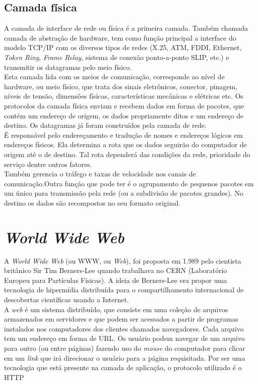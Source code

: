 \subsection{Camada física}
A camada de interface de rede ou física é a primeira camada. Também chamada 
camada de abstração de hardware, tem como função principal a interface do 
modelo TCP/IP com os diversos tipos de redes (X.25, ATM, FDDI, Ethernet, 
\textit{Token Ring}, \textit{Frame Relay}, sistema de conexão ponto-a-ponto 
SLIP, etc.) e transmitir os datagramas pelo meio físico.\\
Esta camada lida com os meios de comunicação, corresponde ao nível de hardware, 
ou meio físico, que trata dos sinais eletrônicos, conector, pinagem, níveis de 
tensão, dimensões físicas, características mecânicas e elétricas etc. Os 
protocolos da camada física enviam e recebem dados em forma de pacotes, que 
contém um endereço de origem, os dados propriamente ditos e um endereço de 
destino. Os datagramas já foram construídos pela camada de rede.\\
É responsável pelo endereçamento e tradução de nomes e endereços lógicos em 
endereços físicos. Ela determina a rota que os dados seguirão do computador de 
origem até o de destino. Tal rota dependerá das condições da rede, prioridade 
do serviço dentre outros fatores.\\
Também gerencia o tráfego e taxas de velocidade nos canais de comunicação.Outra 
função que pode ter é o agrupamento de pequenos pacotes em um único para  
transmissão pela rede (ou a subdivisão de pacotes grandes). No destino os dados 
são recompostos no seu formato original.\\
\section{\textit{World Wide Web}}
A \textit{World Wide Web} (ou WWW, ou \textit{Web}), foi proposta em 1.989 pelo 
cientista britânico Sir Tim Berners-Lee quando trabalhava no CERN (Laboratório 
Europeu para Partículas Físicas). A ideia de Berners-Lee era propor uma 
tecnologia de hipermídia distribuída para o compartilhamento internacional de 
descobertas científicas usando a Internet.\\
A \textit{web} é um sistema distribuído, que consiste em uma coleção de 
arquivos armazenados em servidores e que podem ser acessados a partir de 
programas instalados nos computadores dos clientes chamados navegadores. Cada 
arquivo tem um endereço em forma de URL. Os usuário podem navegar de um arquivo 
para outro (ou entre páginas) fazendo uso do \textit{mouse} do computador para 
clicar em um \textit{link} que irá direcionar o usuário para a página 
requisitada. Por ser uma tecnologia que está presente na camada de aplicação, o 
protocolo utilizado é o HTTP\\
